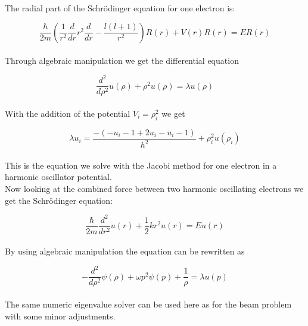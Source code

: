 \documentclass{article}
\begin{document}
The radial part of the Schrödinger equation for one electron is:

\begin{equation} \label{eq:radialSchrödinger}
  \frac{\hbar}{2m} \left( \frac{1}{r^2} \frac{d}{dr}r^2 \frac{d}{dr} - \frac{l(l+1)}{r^2} \right) R(r) + V(r)R(r) = ER(r)
\end{equation} \\

Through algebraic manipulation we get the differential equation

\begin{equation} \label{eq:diffeqSchrödingeronee}
  \frac{d^2}{d\rho^2}u(\rho) + \rho^2 u(\rho) = \lambda u(\rho)
\end{equation} \\

With the addition of the potential $V_i = \rho^2_i$ we get

\begin{equation} \label{eq:lambdaui}
  \lambda u_i = \frac{-(-u_i-1 + 2u_i - u_i-1)}{h^2} + \rho_i^2 u(\rho_i)
\end{equation} \\

This is the equation we solve with the Jacobi method for one electron in a harmonic oscillator potential. \\

Now looking at the combined force between two harmonic oscillating electrons we get the Schrödinger equation:

\begin{equation} \label{eq:Schrödingereqtwoe}
  \frac{\hbar}{2m} \frac{d^2}{dr^2} u(r) + \frac{1}{2}kr^2 u(r) = E u(r)
\end{equation} \\

By using algebraic manipulation the equation can be rewritten as

\begin{equation} \label{eq:diffeqSchrödingertwoe}
   - \frac{d^2}{d\rho^2}\psi(\rho) + \omega p^2 \psi(p) + \frac{1}{\rho} = \lambda u(p)
\end{equation} \\

The same numeric eigenvalue solver can be used here as for the beam problem with some minor adjustments.


\vspace{1cm}
\end{document}
